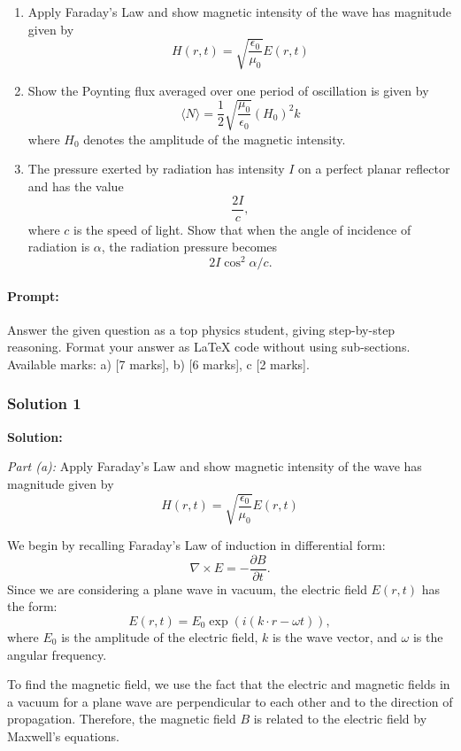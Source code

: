 \documentclass{article}
\begin{document}
\begin{enumerate}
    \item[(a)] Apply Faraday’s Law and show magnetic intensity of the wave has magnitude given by
    \[
    H(r, t) = \sqrt{\frac{\epsilon_0}{\mu_0}} E(r, t)
    \]

    \item[(b)] Show the Poynting flux averaged over one period of oscillation is given by
    \[
    \langle N \rangle = \frac{1}{2} \sqrt{\frac{\mu_0}{\epsilon_0}} (H_0)^2 \hat{k}
    \]
    where \(H_0\) denotes the amplitude of the magnetic intensity.

    \item[(c)] The pressure exerted by radiation has intensity \(I\) on a perfect planar reflector and has the value
    \[
    \frac{2I}{c},
    \]
    where \(c\) is the speed of light. Show that when the angle of incidence of radiation is \(\alpha\), the radiation pressure becomes
    \[
    2I \cos^2 \alpha / c.
    \]
\end{enumerate}


\paragraph{Prompt: \\} 
Answer the given question as a top physics student, giving step-by-step reasoning. Format your answer as LaTeX code without using sub-sections. Available marks: a) [7 marks], b) [6 marks], c [2 marks].

\subsubsection{Solution 1}
\textbf{Solution:}

\textit{Part (a):} Apply Faraday’s Law and show magnetic intensity of the wave has magnitude given by
\[
H(r, t) = \sqrt{\frac{\epsilon_0}{\mu_0}} E(r, t)
\]

We begin by recalling Faraday’s Law of induction in differential form:
\[
\nabla \times E = - \frac{\partial B}{\partial t}.
\]
Since we are considering a plane wave in vacuum, the electric field \(E(r,t)\) has the form:
\[
E(r, t) = E_0 \exp(i(k \cdot r - \omega t)),
\]
where \(E_0\) is the amplitude of the electric field, \(k\) is the wave vector, and \(\omega\) is the angular frequency.

To find the magnetic field, we use the fact that the electric and magnetic fields in a vacuum for a plane wave are perpendicular to each other and to the direction of propagation. Therefore, the magnetic field \(B\) is related to the electric field by Maxwell's equations.
\end{document}
